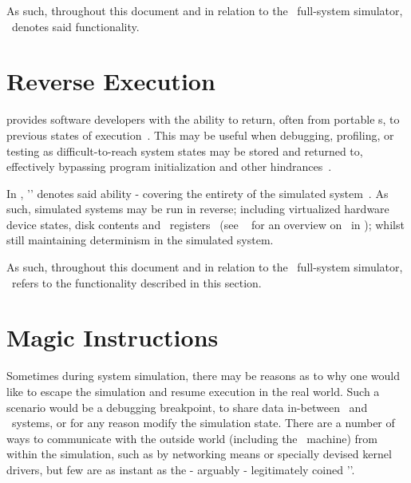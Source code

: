 As such, throughout this document and in relation to the \dvttermsimics\ full-system simulator, \dvttermcheckpointing\ denotes said functionality.

\section{Reverse Execution}
\label{sec:background_reverseexecution}
 provides software developers with the ability to return, often from portable \dvttermcheckpoint s, to previous states of execution~.
This may be useful when debugging, profiling, or testing as difficult-to-reach system states may be stored and returned to, effectively bypassing program initialization and other hindrances~.

In \dvttermsimics , '\dvttermreverseexecution ' denotes said ability - covering the entirety of the simulated system~.
As such, simulated systems may be run in reverse; including virtualized hardware device states, disk contents and \dvttermcpu\ registers~ (see ~ for an overview on \dvttermreverseexecution\ in \dvttermsimics ); whilst still maintaining determinism in the simulated system.

As such, throughout this document and in relation to the \dvttermsimics\ full-system simulator, \dvttermreverseexecution\ refers to the functionality described in this section.

\section{Magic Instructions}
\label{sec:background_magicinstructions}
Sometimes during system simulation, there may be reasons as to why one would like to escape the simulation and resume execution in the real world.
Such a scenario would be a debugging breakpoint, to share data in-between \dvttermtarget\ and \dvttermhost\ systems, or for any reason modify the simulation state.
There are a number of ways to communicate with the outside world (including the \dvttermhost\ machine) from within the simulation, such as by networking means or specially devised kernel drivers, but few are as instant as the - arguably - legitimately coined '\dvttermmagicinstruction '.

